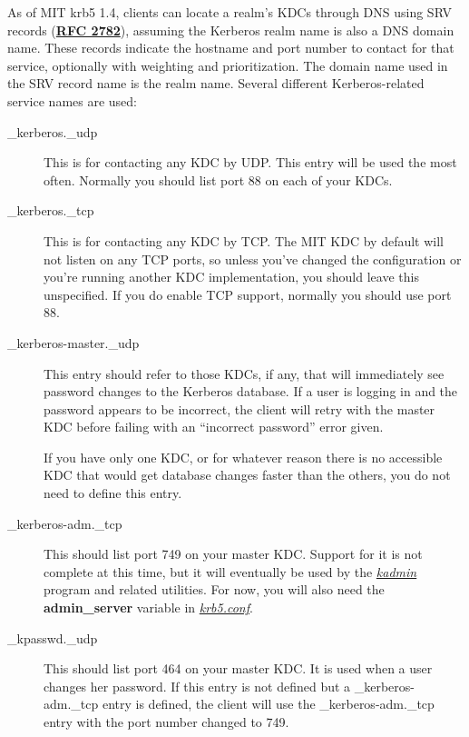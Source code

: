 \documentclass[letterpaper,10pt,english]{sphinxmanual}
\begin{document}
As of MIT krb5 1.4, clients can locate a realm's KDCs through DNS
using SRV records (\href{http://tools.ietf.org/html/rfc2782.html}{\textbf{RFC 2782}}), assuming the Kerberos realm name is
also a DNS domain name.  These records indicate the hostname and port
number to contact for that service, optionally with weighting and
prioritization.  The domain name used in the SRV record name is the
realm name.  Several different Kerberos-related service names are
used:
\begin{description}
\item[{\_kerberos.\_udp}] \leavevmode
This is for contacting any KDC by UDP.  This entry will be used
the most often.  Normally you should list port 88 on each of your
KDCs.

\item[{\_kerberos.\_tcp}] \leavevmode
This is for contacting any KDC by TCP.  The MIT KDC by default
will not listen on any TCP ports, so unless you've changed the
configuration or you're running another KDC implementation, you
should leave this unspecified.  If you do enable TCP support,
normally you should use port 88.

\item[{\_kerberos-master.\_udp}] \leavevmode
This entry should refer to those KDCs, if any, that will
immediately see password changes to the Kerberos database.  If a
user is logging in and the password appears to be incorrect, the
client will retry with the master KDC before failing with an
``incorrect password'' error given.

If you have only one KDC, or for whatever reason there is no
accessible KDC that would get database changes faster than the
others, you do not need to define this entry.

\item[{\_kerberos-adm.\_tcp}] \leavevmode
This should list port 749 on your master KDC.  Support for it is
not complete at this time, but it will eventually be used by the
{\hyperref[admin/admin_commands/kadmin_local:kadmin-1]{\emph{kadmin}}} program and related utilities.  For now, you will
also need the \textbf{admin\_server} variable in {\hyperref[admin/conf_files/krb5_conf:krb5-conf-5]{\emph{krb5.conf}}}.

\item[{\_kpasswd.\_udp}] \leavevmode
This should list port 464 on your master KDC.  It is used when a
user changes her password.  If this entry is not defined but a
\_kerberos-adm.\_tcp entry is defined, the client will use the
\_kerberos-adm.\_tcp entry with the port number changed to 749.

\end{description}
\end{document}
